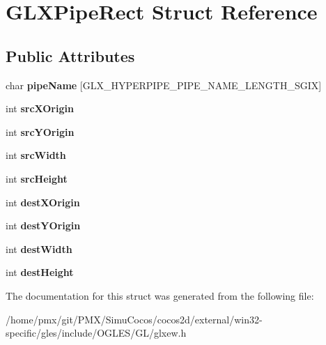 \hypertarget{structGLXPipeRect}{}\section{G\+L\+X\+Pipe\+Rect Struct Reference}
\label{structGLXPipeRect}
\subsection*{Public Attributes}
\begin{DoxyCompactItemize}
\item 
\mbox{\label{structGLXPipeRect_a05c8dab63efa1fd7e8adf3e728b4607d}} 
char {\bfseries pipe\+Name} \mbox{[}G\+L\+X\+\_\+\+H\+Y\+P\+E\+R\+P\+I\+P\+E\+\_\+\+P\+I\+P\+E\+\_\+\+N\+A\+M\+E\+\_\+\+L\+E\+N\+G\+T\+H\+\_\+\+S\+G\+IX\mbox{]}
\item 
\mbox{\label{structGLXPipeRect_a9df2313c01f75d149e64f2ff467bc266}} 
int {\bfseries src\+X\+Origin}
\item 
\mbox{\label{structGLXPipeRect_a1f7316dff7050ab2ce9d3d37f8c5450e}} 
int {\bfseries src\+Y\+Origin}
\item 
\mbox{\label{structGLXPipeRect_a2c6c180a4dabb71076366e06a1c7d0ef}} 
int {\bfseries src\+Width}
\item 
\mbox{\label{structGLXPipeRect_a35632524bce6bffa05f284a9b1c1b8ff}} 
int {\bfseries src\+Height}
\item 
\mbox{\label{structGLXPipeRect_a8b7b941894ad3420326d7e9fa885bb71}} 
int {\bfseries dest\+X\+Origin}
\item 
\mbox{\label{structGLXPipeRect_aef7766b02ef07c20a11e89da5878b469}} 
int {\bfseries dest\+Y\+Origin}
\item 
\mbox{\label{structGLXPipeRect_a3c07991d2a8fb6e973eae834650b3dad}} 
int {\bfseries dest\+Width}
\item 
\mbox{\label{structGLXPipeRect_a858b0ea6642e451495aff35cfefbd083}} 
int {\bfseries dest\+Height}
\end{DoxyCompactItemize}


The documentation for this struct was generated from the following file\+:\begin{DoxyCompactItemize}
\item 
/home/pmx/git/\+P\+M\+X/\+Simu\+Cocos/cocos2d/external/win32-\/specific/gles/include/\+O\+G\+L\+E\+S/\+G\+L/glxew.\+h\end{DoxyCompactItemize}

